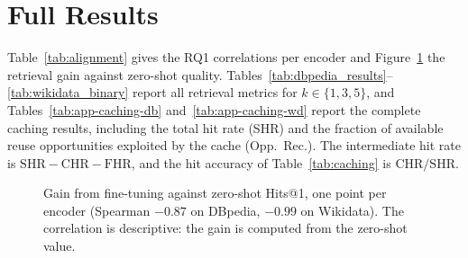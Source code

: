 \documentclass[runningheads]{llncs}
\begin{document}



\clearpage
\appendix
\renewcommand{\theHsection}{appendix.\Alph{section}}
\section{Full Results}
\label{app:full}

Table~\ref{tab:alignment} gives the RQ1 correlations per encoder and
Figure~\ref{fig:gain} the retrieval gain against zero-shot quality.
Tables~\ref{tab:dbpedia_results}--\ref{tab:wikidata_binary} report all
retrieval metrics for $k \in \{1,3,5\}$, and
Tables~\ref{tab:app-caching-db} and~\ref{tab:app-caching-wd} report the
complete caching results, including the total hit rate (SHR) and the
fraction of available reuse opportunities exploited by the cache
(Opp.~Rec.). The intermediate hit rate is $\mathrm{SHR} - \mathrm{CHR} -
\mathrm{FHR}$, and the hit accuracy of Table~\ref{tab:caching} is
$\mathrm{CHR}/\mathrm{SHR}$.


\begin{figure}[htbp]
\centering
{}
\caption{Gain from fine-tuning against zero-shot Hits@1, one point per
encoder (Spearman $-0.87$ on DBpedia, $-0.99$ on Wikidata). The
correlation is descriptive: the gain is computed from the zero-shot value.}
\label{fig:gain}
\end{figure}
\end{document}
